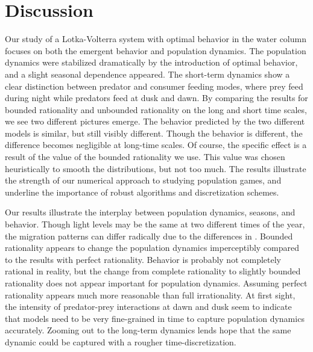 \section{Discussion}
Our study of a Lotka-Volterra system with optimal behavior in the water column focuses on both the emergent behavior and population dynamics. The population dynamics were stabilized dramatically by the introduction of optimal behavior, and a slight seasonal dependence appeared. The short-term dynamics show a clear distinction between predator and consumer feeding modes, where prey feed during night while predators feed at dusk and dawn. By comparing the results for bounded rationality and unbounded rationality on the long and short time scales, we see two different pictures emerge. The behavior predicted by the two different models is similar, but still visibly different. Though the behavior is different, the difference becomes negligible at long-time scales. Of course, the specific effect is a result of the value of the bounded rationality we use. This value was chosen heuristically to smooth the distributions, but not too much. The results illustrate the strength of our numerical approach to studying population games, and underline the importance of robust algorithms and discretization schemes.


Our results illustrate the interplay between population dynamics, seasons, and behavior. Though light levels may be the same at two different times of the year, the migration patterns can differ radically due to the differences in . Bounded rationality appears to change the population dynamics imperceptibly compared to the results with perfect rationality. Behavior is probably not completely rational in reality, but the change from complete rationality to slightly  bounded rationality does not appear important for population dynamics. Assuming perfect rationality appears much more reasonable than full irrationality. At first sight, the intensity of predator-prey interactions at dawn and dusk seem to indicate that models need to be very fine-grained in time to capture population dynamics accurately. Zooming out to the long-term dynamics lends hope that the same dynamic could be captured with a rougher time-discretization.


